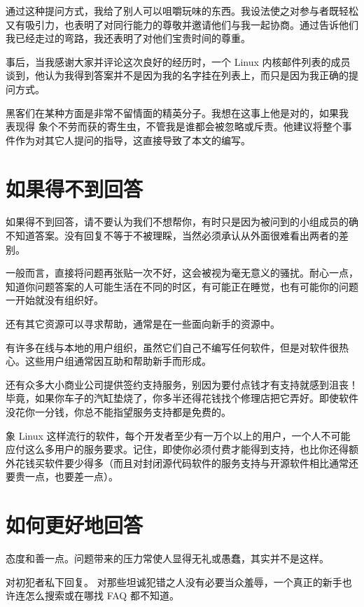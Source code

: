 通过这种提问方式，我给了别人可以咀嚼玩味的东西。我设法使之对参与者既轻松又有吸引力，也表明了对同行能力的尊敬并邀请他们与我一起协商。通过告诉他们我已经走过的弯路，我还表明了对他们宝贵时间的尊重。

事后，当我感谢大家并评论这次良好的经历时，一个 Linux 内核邮件列表的成员谈到，他认为我得到答案并不是因为我的名字挂在列表上，而只是因为我正确的提问方式。

黑客们在某种方面是非常不留情面的精英分子。我想在这事上他是对的，如果我 表现得 象个不劳而获的寄生虫，不管我是谁都会被忽略或斥责。他建议将整个事件作为对其它人提问的指导，这直接导致了本文的编写。



\section{如果得不到回答}

如果得不到回答，请不要认为我们不想帮你，有时只是因为被问到的小组成员的确不知道答案。没有回复不等于不被理睬，当然必须承认从外面很难看出两者的差别。

一般而言，直接将问题再张贴一次不好，这会被视为毫无意义的骚扰。耐心一点，知道你问题答案的人可能生活在不同的时区，有可能正在睡觉，也有可能你的问题一开始就没有组织好。

还有其它资源可以寻求帮助，通常是在一些面向新手的资源中。

有许多在线与本地的用户组织，虽然它们自己不编写任何软件，但是对软件很热心。这些用户组通常因互助和帮助新手而形成。

还有众多大小商业公司提供签约支持服务，别因为要付点钱才有支持就感到沮丧！毕竟，如果你车子的汽缸垫烧了，你多半还得花钱找个修理店把它弄好。即使软件没花你一分钱，你总不能指望服务支持都是免费的。

象 Linux 这样流行的软件，每个开发者至少有一万个以上的用户，一个人不可能应付这么多用户的服务要求。记住，即使你必须付费才能得到支持，也比你还得额外花钱买软件要少得多（而且对封闭源代码软件的服务支持与开源软件相比通常还要贵一点，也要差一点）。




\section{如何更好地回答}

态度和善一点。问题带来的压力常使人显得无礼或愚蠢，其实并不是这样。

对初犯者私下回复。 对那些坦诚犯错之人没有必要当众羞辱，一个真正的新手也许连怎么搜索或在哪找 FAQ 都不知道。

